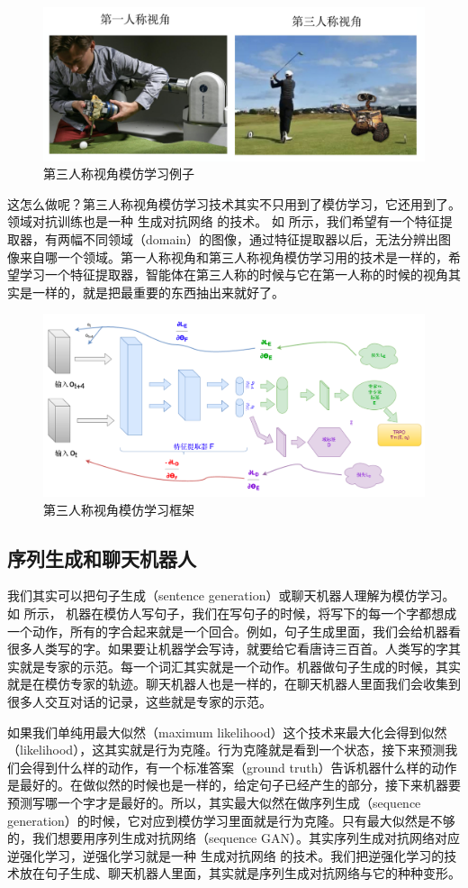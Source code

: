 \begin{figure}[htb]
   \centering
   \includegraphics[width=0.5\linewidth]{res/ch11/11.13}
   \caption{第三人称视角模仿学习例子}
   \label{fig:fig11.13}
\end{figure}

这怎么做呢？第三人称视角模仿学习技术其实不只用到了模仿学习，它还用到了。领域对抗训练也是一种 生成对抗网络 的技术。
如 所示，我们希望有一个特征提取器，有两幅不同领域（domain）的图像，通过特征提取器以后，无法分辨出图像来自哪一个领域。第一人称视角和第三人称视角模仿学习用的技术是一样的，希望学习一个特征提取器，智能体在第三人称的时候与它在第一人称的时候的视角其实是一样的，就是把最重要的东西抽出来就好了。 

\begin{figure}[htb]
   \centering
   \includegraphics[width=0.5\linewidth]{res/ch11/11.14}
   \caption{第三人称视角模仿学习框架}
   \label{fig:fig11.14}
\end{figure}

\subsection{序列生成和聊天机器人} 

我们其实可以把句子生成（sentence generation）或聊天机器人理解为模仿学习。
如 所示，
机器在模仿人写句子，我们在写句子的时候，将写下的每一个字都想成一个动作，所有的字合起来就是一个回合。例如，句子生成里面，我们会给机器看很多人类写的字。如果要让机器学会写诗，就要给它看唐诗三百首。人类写的字其实就是专家的示范。每一个词汇其实就是一个动作。机器做句子生成的时候，其实就是在模仿专家的轨迹。聊天机器人也是一样的，在聊天机器人里面我们会收集到很多人交互对话的记录，这些就是专家的示范。

如果我们单纯用最大似然（maximum likelihood）这个技术来最大化会得到似然（likelihood），这其实就是行为克隆。行为克隆就是看到一个状态，接下来预测我们会得到什么样的动作，有一个标准答案（ground truth）告诉机器什么样的动作是最好的。在做似然的时候也是一样的，给定句子已经产生的部分，接下来机器要预测写哪一个字才是最好的。所以，其实最大似然在做序列生成（sequence generation）的时候，它对应到模仿学习里面就是行为克隆。只有最大似然是不够的，我们想要用序列生成对抗网络（sequence GAN）。其实序列生成对抗网络对应逆强化学习，逆强化学习就是一种 生成对抗网络 的技术。我们把逆强化学习的技术放在句子生成、聊天机器人里面，其实就是序列生成对抗网络与它的种种变形。


